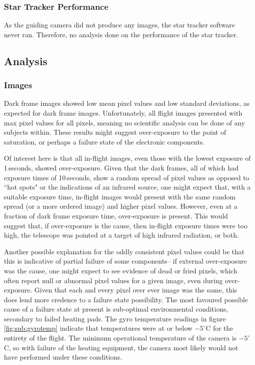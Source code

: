 \subsubsection*{Star Tracker Performance}
As the guiding camera did not produce any images, the star tracker software never ran. Therefore, no analysis done on the performance of the star tracker.

\subsection{Analysis}

\subsubsection{Images}

Dark frame images showed low mean pixel values and low standard deviations, as expected for dark frame images. Unfortunately, all flight images presented with max pixel values for all pixels, meaning no scientific analysis can be done of any subjects within. These results might suggest over-exposure to the point of saturation, or perhaps a failure state of the electronic components.

Of interest here is that all in-flight images, even those with the lowest exposure of 1\,seconds, showed over-exposure. Given that the dark frames, all of which had exposure times of 10\,seconds, show a random spread of pixel values as opposed to ``hot spots" or the indications of an infrared source, one might expect that, with a suitable exposure time, in-flight images would present with the same random spread (or a more ordered image) and higher pixel values. However, even at a fraction of dark frame exposure time, over-exposure is present. This would suggest that, if over-exposure is the cause, then in-flight exposure times were too high, the telescope was pointed at a target of high infrared radiation, or both. 

Another possible explanation for the oddly consistent pixel values could be that this is indicative of partial failure of some components-- if external over-exposure was the cause, one might expect to see evidence of dead or fried pixels, which often report null or abnormal pixel values for a given image, even during over-exposure. Given that each and every pixel over ever image was the same, this does lend more credence to a failure state possibility. The most favoured possible cause of a failure state at present is sub-optimal environmental conditions, secondary to failed heating pads. The gyro temperature readings in figure \ref{fig:sub:gyrotemp} indicate that temperatures were at or below $-5^{\circ}$C for the entirety of the flight. The minimum operational temperature of the camera is $-5^{\circ}$C, so with failure of the heating equipment, the camera most likely would not have performed under these conditions. 

